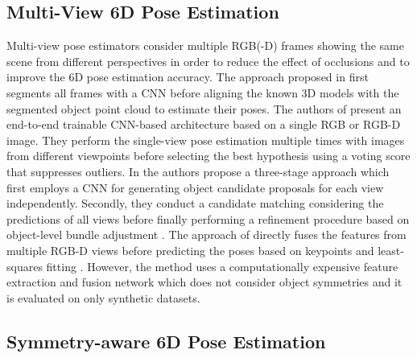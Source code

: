 \subsection{Multi-View 6D Pose Estimation}

Multi-view pose estimators consider multiple RGB(-D) frames showing the same scene from different perspectives in order to reduce the effect of occlusions and to improve the 6D pose estimation accuracy.
The approach proposed in \cite{zeng2017multi} first segments all frames with a CNN before aligning the known 3D models with the segmented object point cloud to estimate their poses.
The authors of \cite{li2018unified} present an end-to-end trainable CNN-based architecture based on a single RGB or RGB-D image. They perform the single-view pose estimation multiple times with images from different viewpoints before selecting the best hypothesis using a voting score that suppresses outliers. 
In \cite{cosypose} the authors propose a three-stage approach which first employs a CNN for generating object candidate proposals for each view independently. Secondly, they conduct a candidate matching considering the predictions of all views before finally performing a refinement procedure based on object-level bundle adjustment \cite{triggs2000bundle}.
The approach of \cite{mv6d} directly fuses the features from multiple RGB-D views before predicting the poses based on keypoints and least-squares fitting \cite{leastSquares}. However, the method uses a computationally expensive feature extraction and fusion network which does not consider object symmetries and it is evaluated on only synthetic datasets.



\subsection{Symmetry-aware 6D Pose Estimation}

